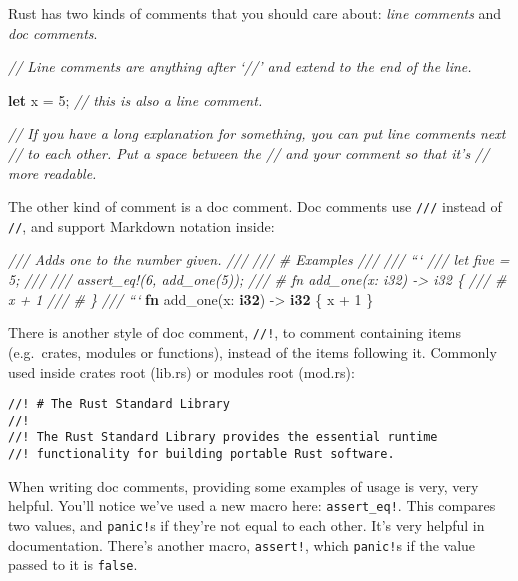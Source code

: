 \documentclass[a4paper,]{book}
\newenvironment{Shaded}{\begin{snugshade}}{\end{snugshade}}
\newcommand{\KeywordTok}[1]{\textcolor[rgb]{0.13,0.29,0.53}{\textbf{{#1}}}}
\newcommand{\DecValTok}[1]{\textcolor[rgb]{0.00,0.00,0.81}{{#1}}}
\newcommand{\CommentTok}[1]{\textcolor[rgb]{0.56,0.35,0.01}{\textit{{#1}}}}
\newcommand{\NormalTok}[1]{{#1}}
\begin{document}
Rust has two kinds of comments that you should care about: \emph{line
comments} and \emph{doc comments}.

\begin{Shaded}
\begin{Highlighting}[]
\CommentTok{// Line comments are anything after ‘//’ and extend to the end of the line.}

\KeywordTok{let} \NormalTok{x = }\DecValTok{5}\NormalTok{; }\CommentTok{// this is also a line comment.}

\CommentTok{// If you have a long explanation for something, you can put line comments next}
\CommentTok{// to each other. Put a space between the // and your comment so that it’s}
\CommentTok{// more readable.}
\end{Highlighting}
\end{Shaded}

The other kind of comment is a doc comment. Doc comments use
\texttt{///} instead of \texttt{//}, and support Markdown notation
inside:

\begin{Shaded}
\begin{Highlighting}[]
\CommentTok{/// Adds one to the number given.}
\CommentTok{///}
\CommentTok{/// # Examples}
\CommentTok{///}
\CommentTok{/// ```}
\CommentTok{/// let five = 5;}
\CommentTok{///}
\CommentTok{/// assert_eq!(6, add_one(5));}
\CommentTok{/// # fn add_one(x: i32) -> i32 \{}
\CommentTok{/// #     x + 1}
\CommentTok{/// # \}}
\CommentTok{/// ```}
\KeywordTok{fn} \NormalTok{add_one(x: }\KeywordTok{i32}\NormalTok{) -> }\KeywordTok{i32} \NormalTok{\{}
    \NormalTok{x + }\DecValTok{1}
\NormalTok{\}}
\end{Highlighting}
\end{Shaded}

There is another style of doc comment, \texttt{//!}, to comment
containing items (e.g.~crates, modules or functions), instead of the
items following it. Commonly used inside crates root (lib.rs) or modules
root (mod.rs):

\begin{verbatim}
//! # The Rust Standard Library
//!
//! The Rust Standard Library provides the essential runtime
//! functionality for building portable Rust software.
\end{verbatim}

When writing doc comments, providing some examples of usage is very,
very helpful. You'll notice we've used a new macro here:
\texttt{assert\_eq!}. This compares two values, and \texttt{panic!}s if
they're not equal to each other. It's very helpful in documentation.
There's another macro, \texttt{assert!}, which \texttt{panic!}s if the
value passed to it is \texttt{false}.
\end{document}
